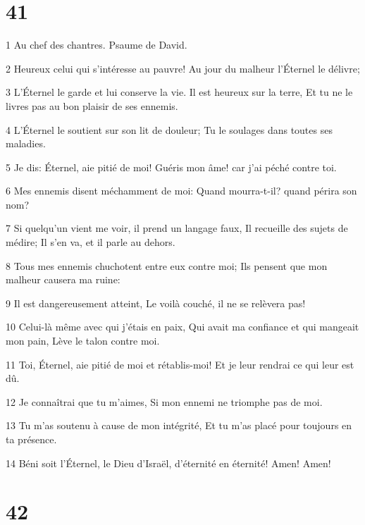 \chapter{41}

\par 1 Au chef des chantres. Psaume de David.
\par 2 Heureux celui qui s'intéresse au pauvre! Au jour du malheur l'Éternel le délivre;
\par 3 L'Éternel le garde et lui conserve la vie. Il est heureux sur la terre, Et tu ne le livres pas au bon plaisir de ses ennemis.
\par 4 L'Éternel le soutient sur son lit de douleur; Tu le soulages dans toutes ses maladies.
\par 5 Je dis: Éternel, aie pitié de moi! Guéris mon âme! car j'ai péché contre toi.
\par 6 Mes ennemis disent méchamment de moi: Quand mourra-t-il? quand périra son nom?
\par 7 Si quelqu'un vient me voir, il prend un langage faux, Il recueille des sujets de médire; Il s'en va, et il parle au dehors.
\par 8 Tous mes ennemis chuchotent entre eux contre moi; Ils pensent que mon malheur causera ma ruine:
\par 9 Il est dangereusement atteint, Le voilà couché, il ne se relèvera pas!
\par 10 Celui-là même avec qui j'étais en paix, Qui avait ma confiance et qui mangeait mon pain, Lève le talon contre moi.
\par 11 Toi, Éternel, aie pitié de moi et rétablis-moi! Et je leur rendrai ce qui leur est dû.
\par 12 Je connaîtrai que tu m'aimes, Si mon ennemi ne triomphe pas de moi.
\par 13 Tu m'as soutenu à cause de mon intégrité, Et tu m'as placé pour toujours en ta présence.
\par 14 Béni soit l'Éternel, le Dieu d'Israël, d'éternité en éternité! Amen! Amen!

\chapter{42}

